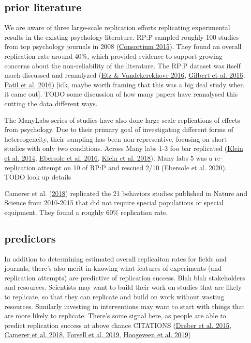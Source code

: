 \documentclass[
  english,
  a4paper,
]{article}
\begin{document}
\hypertarget{prior-literature}{%
\subsection{prior literature}\label{prior-literature}}

We are aware of three large-scale replication efforts replicating experimental results in the existing psychology literature. RP:P sampled roughly 100 studies from top psychology journals in 2008 (\protect\hyperlink{ref-openscienceconsortium2015}{Consortium 2015}). They found an overall replication rate around 40\%, which provided evidence to support growing concerns about the non-reliability of the literature. The RP:P dataset was itself much discussed and reanalyzed (\protect\hyperlink{ref-etz2016}{Etz \& Vandekerckhove 2016}, \protect\hyperlink{ref-gilbert2016}{Gilbert et al. 2016}, \protect\hyperlink{ref-patil2016}{Patil et al. 2016}) {[}idk, maybe worth framing that this was a big deal study when it came out{]}. TODO some discussion of how many papers have reanalysed this cutting the data different ways.

The ManyLabs series of studies have also done large-scale replications of effects from psychology. Due to their primary goal of investigating different forms of hetereogeneity, their sampling has been non-representive, focusing on short studies with only two conditions. Across Many labs 1-3 foo bar replicated (\protect\hyperlink{ref-klein2014}{Klein et al. 2014}, \protect\hyperlink{ref-ebersole2016}{Ebersole et al. 2016}, \protect\hyperlink{ref-klein2018}{Klein et al. 2018}). Many labs 5 was a re-replication attempt on 10 of RP:P and rescued 2/10 (\protect\hyperlink{ref-ebersole2020}{Ebersole et al. 2020}). TODO look up details

Camerer et al. (\protect\hyperlink{ref-camerer2018}{2018}) replicated the 21 behaviors studies published in Nature and Science from 2010-2015 that did not require special populations or special equipment. They found a roughly 60\% replication rate.

\hypertarget{predictors}{%
\subsection{predictors}\label{predictors}}

In addition to determining estimated overall replicaiton rates for fields and journals, there's also merit in knowing what features of experiments (and replication attempts) are predictive of replication success. Blah blah stakeholders and resources. Scientists may want to build their work on studies that are likely to replicate, so that they can replicate and build on work without wasting resources. Similarly investing in interventions may want to start with things that are more likely to replicate. There's some signal here, as people are able to predict replication success at above chance CITATIONS (\protect\hyperlink{ref-dreber2015}{Dreber et al. 2015}, \protect\hyperlink{ref-camerer2018}{Camerer et al. 2018}, \protect\hyperlink{ref-forsell2019}{Forsell et al. 2019}, \protect\hyperlink{ref-hoogeveen2019}{Hoogeveen et al. 2019})
\end{document}
